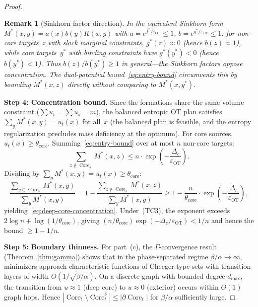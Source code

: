 \documentclass[lettersize,journal]{IEEEtran}
\newtheorem{remark}{Remark}
\DeclareMathOperator{\Core}{Core}
\begin{document}
\begin{proof}
\begin{remark}[Sinkhorn factor direction]
In the equivalent Sinkhorn form $M^*(x,y) = a(x) b(y) K(x,y)$ with $a = e^{f^*/\varepsilon_{\mathrm{OT}}} \leq 1$, $b = e^{g^*/\varepsilon_{\mathrm{OT}}} \leq 1$: for non-core targets~$z$ with slack marginal constraints, $g^*(z) \approx 0$ (hence $b(z) \approx 1$), while core targets~$y^*$ with binding constraints have $g^*(y^*) < 0$ (hence $b(y^*) < 1$). Thus $b(z)/b(y^*) \geq 1$ in general---the Sinkhorn factors \emph{oppose} concentration. The dual-potential bound~\eqref{eq:entry-bound} circumvents this by bounding $M^*(x,z)$ directly without comparing to $M^*(x,y^*)$.
\end{remark}

\medskip\noindent\textbf{Step 4: Concentration bound.}
Since the formations share the same volume constraint ($\sum u_t = \sum u_s = m$), the balanced entropic OT plan satisfies $\sum_y M^*(x,y) = u_t(x)$ for all~$x$ (the balanced plan is feasible, and the entropy regularization precludes mass deficiency at the optimum). For core sources, $u_t(x) \geq \theta_{\mathrm{core}}$. Summing~\eqref{eq:entry-bound} over at most $n$ non-core targets:
\[
\sum_{z \notin \Core_s} M^*(x,z) \leq n \cdot \exp\!\left(-\frac{\Delta_c}{\varepsilon_{\mathrm{OT}}}\right).
\]
Dividing by $\sum_y M^*(x,y) = u_t(x) \geq \theta_{\mathrm{core}}$:
\[
\frac{\sum_{y \in \Core_s} M^*(x,y)}{\sum_y M^*(x,y)} = 1 - \frac{\sum_{z \notin \Core_s} M^*(x,z)}{\sum_y M^*(x,y)} \geq 1 - \frac{n}{\theta_{\mathrm{core}}} \cdot \exp\!\left(-\frac{\Delta_c}{\varepsilon_{\mathrm{OT}}}\right),
\]
yielding~\eqref{eq:deep-core-concentration}. Under~(TC3), the exponent exceeds $2\log n + \log(1/\theta_{\mathrm{core}})$, giving $(n/\theta_{\mathrm{core}})\exp(-\Delta_c/\varepsilon_{\mathrm{OT}}) < 1/n$ and hence the bound $\geq 1 - 1/n$.

\medskip\noindent\textbf{Step 5: Boundary thinness.}
For part~(c), the $\Gamma$-convergence result (Theorem~\ref{thm:gamma}) shows that in the phase-separated regime $\beta/\alpha \to \infty$, minimizers approach characteristic functions of Cheeger-type sets with transition layers of width $O(1/\sqrt{\beta/\alpha})$. On a discrete graph with bounded degree $d_{\max}$, the transition from $u \approx 1$ (deep core) to $u \approx 0$ (exterior) occurs within $O(1)$ graph hops. Hence $|\Core_t \setminus \Core_t^\delta| \leq |\partial\Core_t|$ for $\beta/\alpha$ sufficiently large.
\end{proof}
\end{document}
